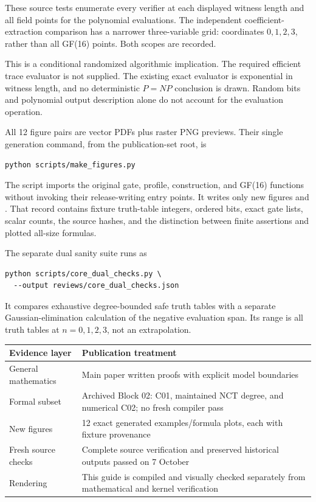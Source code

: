 These source tests enumerate every verifier at each displayed witness length
and all field points for the polynomial evaluations. The independent
coefficient-extraction comparison has a narrower three-variable grid:
coordinates $0,1,2,3$, rather than all GF(16) points. Both scopes are recorded.

This is a conditional randomized algorithmic implication. The required
efficient trace evaluator is not supplied. The existing exact evaluator is
exponential in witness length, and no deterministic $P=NP$ conclusion is
drawn. Random bits and polynomial output description alone do not account
for the evaluation operation.


All 12 figure pairs are vector PDFs plus raster PNG previews. Their single
generation command, from the publication-set root, is
\begin{lstlisting}
python scripts/make_figures.py
\end{lstlisting}
The script imports the original gate, profile, construction, and GF(16)
functions without invoking their release-writing entry points. It writes
only new figures and . That record contains
fixture truth-table integers, ordered bits, exact gate lists, scalar counts,
the source hashes, and the distinction between finite assertions and
plotted all-size formulas.

The separate dual sanity suite runs as
\begin{lstlisting}
python scripts/core_dual_checks.py \
  --output reviews/core_dual_checks.json
\end{lstlisting}
It compares exhaustive degree-bounded safe truth tables with a separate
Gaussian-elimination calculation of the negative evaluation span. Its
range is all truth tables at $n=0,1,2,3$, not an extrapolation.

\begin{tabularx}{\textwidth}{@{}p{1.4in}X@{}}\toprule
Evidence layer & Publication treatment\\\midrule
General mathematics & Main paper written proofs with explicit model boundaries\\
Formal subset & Archived Block 02: C01, maintained NCT degree, and numerical C02; no fresh compiler pass\\
New figures & 12 exact generated examples/formula plots, each with fixture provenance\\
Fresh source checks & Complete source \code{--all} verification and preserved historical outputs passed on 7 October\\
Rendering & This guide is compiled and visually checked separately from mathematical and kernel verification\\\bottomrule
\end{tabularx}

